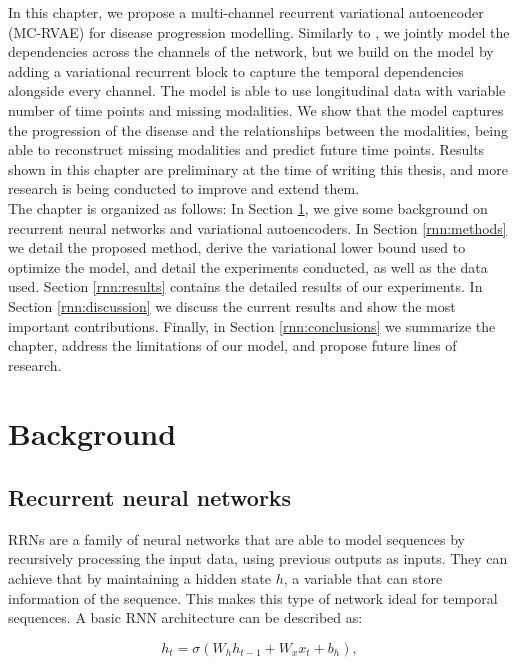 In this chapter, we propose a multi-channel recurrent variational autoencoder  (MC-RVAE) for disease progression modelling. Similarly to \cite{Antelmi2019}, we jointly model the dependencies across the channels of the network, but we build on the model by adding a variational recurrent block to capture the temporal dependencies alongside every channel. The model is able to use longitudinal data with variable number of time points and missing modalities. We show that the model captures the progression of the disease and the relationships between the modalities, being able to reconstruct missing modalities and predict future time points. Results shown in this chapter are preliminary at the time of writing this thesis, and more research is being conducted to improve and extend them. \\

The chapter is organized as follows: In Section \ref{rnn:background}, we give some background on recurrent neural networks and variational autoencoders. In Section \ref{rnn:methods} we detail the proposed method, derive the variational lower bound used to optimize the model, and detail the experiments conducted, as well as the data used. Section \ref{rnn:results} contains the detailed results of our experiments. In Section \ref{rnn:discussion} we discuss the current results and show the most important contributions. Finally, in Section \ref{rnn:conclusions} we summarize the chapter, address the limitations of our model, and propose future lines of research.

\section{Background}
\label{rnn:background}

\subsection{Recurrent neural networks}

RRNs are a family of neural networks that are able to model sequences by recursively processing the input data, using previous outputs as inputs. They can achieve that by maintaining a hidden state $h$, a variable that can store information of the sequence. This makes this type of network ideal for temporal sequences. A basic RNN architecture can be described as:

\begin{equation}
    h_t = \mathit{\sigma}(W_h h_{t-1} + W_x x_{t} + b_h),
\end{equation}

